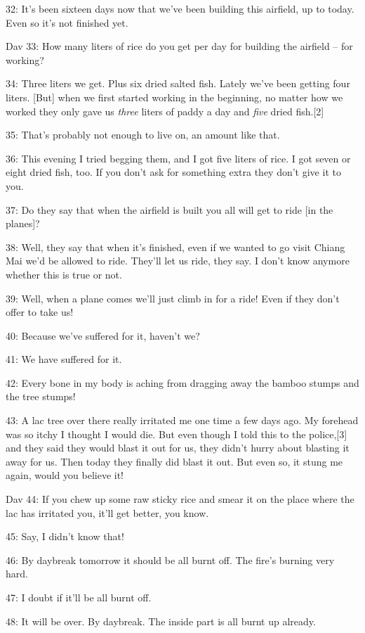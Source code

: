 {32: It's been sixteen days now that we've been building this airfield,
up to today. Even so it's not finished yet.}

{Dav 33: How many liters of rice do you get per day for building the airfield
-- for working?}

{34: Three liters we get. Plus six dried salted fish. Lately we've been
getting four liters. [But] when we first started working in the beginning, no matter
how we worked they only gave us }{\textit{three}}{ liters of paddy
a day and }{\textit{five}}{ dried fish.[2]}

{35: That's probably not enough to live on, an amount like that. }

{36: This evening I tried begging them, and I got five liters of rice. I
got seven or eight dried fish, too. If you don't ask for something extra they don't
give it to you. }

{37: Do they say that when the airfield is built you all will get to ride
[in the planes]? }

{38: Well, they say that when it's finished, even if we wanted to go visit
Chiang Mai we'd be allowed to ride. They'll let us ride, they say. I don't know
anymore whether this is true or not. }

{39: Well, when a plane comes we'll just climb in for a ride! Even if they
don't offer to take us! }

{40: Because we've suffered for it, haven't we?}

{41: We have suffered for it.}

{42: Every bone in my body is aching from dragging away the bamboo stumps
and the tree stumps! }

{43: A lac tree over there really irritated me one time a few days ago.
My forehead was so itchy I thought I would die. But even though I told this to
the police,[3] and they said they would blast it out for us, they didn't hurry
about blasting it away for us. Then today they finally did blast it out. But even
so, it stung me again, would you believe it!}

{Dav 44: If you chew up some raw sticky rice and smear it on the place where
the lac has irritated you, it'll get better, you know.}

{45: Say, I didn't know that! }

{46: By daybreak tomorrow it should be all burnt off. The fire's burning
very hard. }

{47: I doubt if it'll be all burnt off.}

{48: It will be over. By daybreak. The inside part is all burnt up already.
}

